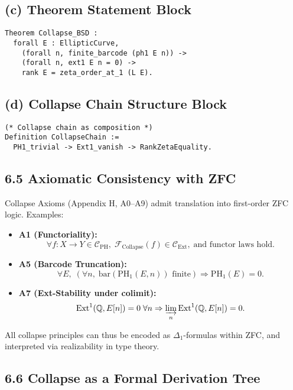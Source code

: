\documentclass[11pt]{article}
\begin{document}
\subsection*{(c) Theorem Statement Block}
\vspace{0.5em}
\begin{lstlisting}[language=Coq]
Theorem Collapse_BSD :
  forall E : EllipticCurve,
    (forall n, finite_barcode (ph1 E n)) ->
    (forall n, ext1 E n = 0) ->
    rank E = zeta_order_at_1 (L E).
\end{lstlisting}

\subsection*{(d) Collapse Chain Structure Block}
\vspace{0.5em}
\begin{lstlisting}[language=Coq]
(* Collapse chain as composition *)
Definition CollapseChain :=
  PH1_trivial -> Ext1_vanish -> RankZetaEquality.
\end{lstlisting}

\subsection{6.5 Axiomatic Consistency with ZFC}

Collapse Axioms (Appendix H, A0–A9) admit translation into first-order ZFC logic. Examples:

\begin{itemize}
  \item \textbf{A1 (Functoriality):}
  \[
  \forall f : X \to Y \in \mathcal{C}_{\mathrm{PH}},\;
  \mathcal{F}_{\mathrm{Collapse}}(f) \in \mathcal{C}_{\mathrm{Ext}},\;
  \text{and functor laws hold}.
  \]
  \item \textbf{A5 (Barcode Truncation):}
  \[
  \forall E,\; (\forall n,\; \text{bar}(\mathrm{PH}_1(E,n)) \text{ finite}) \Rightarrow \mathrm{PH}_1(E) = 0.
  \]
  \item \textbf{A7 (Ext-Stability under colimit):}
  \[
  \mathrm{Ext}^1(\mathbb{Q}, E[n]) = 0\; \forall n \Rightarrow \varinjlim_n \mathrm{Ext}^1(\mathbb{Q}, E[n]) = 0.
  \]
\end{itemize}

All collapse principles can thus be encoded as $\Delta_1$-formulas within ZFC, and interpreted via realizability in type theory.

\subsection{6.6 Collapse as a Formal Derivation Tree}
\end{document}
